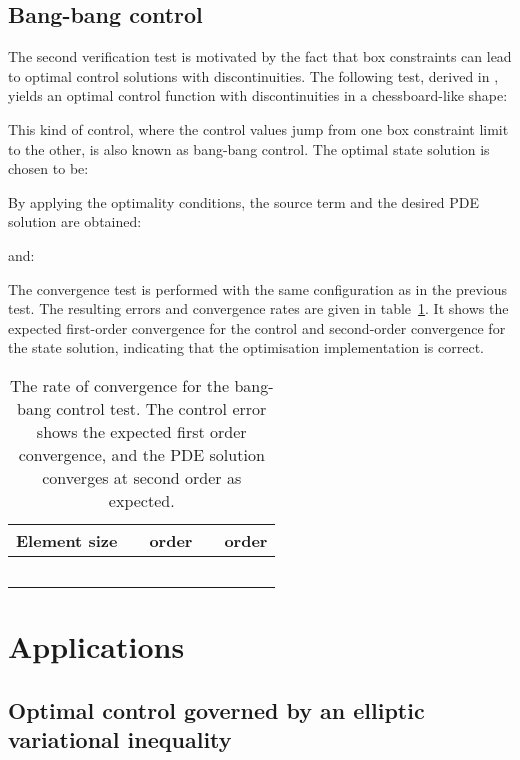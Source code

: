 \documentclass[prodmode,acmtoms]{acmsmall}
\begin{document}
\subsection{Bang-bang control}
The second verification test is motivated by the fact that box constraints can lead to optimal control solutions with discontinuities.
The following test, derived in , yields an optimal control function with discontinuities in a chessboard-like shape:

This kind of control, where the control values jump from one box constraint limit to the other, is also known as bang-bang control.
The optimal state solution is chosen to be:

By applying the optimality conditions, the source term  and the desired PDE solution  are obtained:

and:


The convergence test is performed with the same configuration as in the previous test. 
The resulting errors and convergence rates are given in table~\ref{fig:rate_of_convergence_bang_bang}.
It shows the expected first-order convergence for the control and second-order convergence for the state solution,
indicating that the optimisation implementation is correct.

\begin{table}
\centering
  \begin{tabular}{ccccc}
    Element size & \small{} & order & \small{} & order \\
    \hline
     &  &  &  & \\
     &  &  &  &  \\
     &  &  &  &  \\
     &  &  &  &  \\
     &  &  &  &  \\
  \end{tabular}
\caption{The rate of convergence for the bang-bang control test. The control error shows the expected first order convergence,
and the PDE solution converges at second order as expected.}
\label{fig:rate_of_convergence_bang_bang}
\end{table}

\section{Applications}\label{sec:applications}

\subsection{Optimal control governed by an elliptic variational inequality} \label{sec:mpec}
\end{document}

